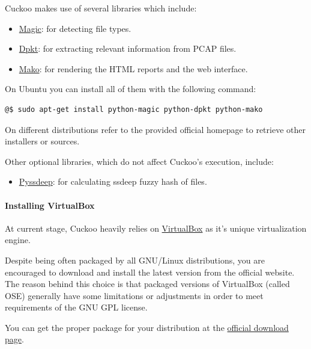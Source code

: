 \documentclass[letterpaper,10pt,english]{sphinxmanual}
\begin{document}
Cuckoo makes use of several libraries which include:
\begin{itemize}
\item {} 
\href{http://www.darwinsys.com/file/}{Magic}: for detecting file types.

\item {} 
\href{http://code.google.com/p/dpkt/}{Dpkt}: for extracting relevant information from PCAP files.

\item {} 
\href{http://www.makotemplates.org}{Mako}: for rendering the HTML reports and the web interface.

\end{itemize}

On Ubuntu you can install all of them with the following command:

\begin{Verbatim}[commandchars=@\[\]]
@$ sudo apt-get install python-magic python-dpkt python-mako
\end{Verbatim}

On different distributions refer to the provided official homepage to retrieve
other installers or sources.

Other optional libraries, which do not affect Cuckoo's execution, include:
\begin{itemize}
\item {} 
\href{http://code.google.com/p/pyssdeep/}{Pyssdeep}: for calculating ssdeep fuzzy hash of files.

\end{itemize}


\paragraph{Installing VirtualBox}
\label{installation/host/requirements:pyssdeep}\label{installation/host/requirements:installing-virtualbox}
At current stage, Cuckoo heavily relies on \href{http://www.virtualbox.org}{VirtualBox} as it's unique
virtualization engine.

Despite being often packaged by all GNU/Linux distributions, you are encouraged
to download and install the latest version from the official website. The reason
behind this choice is that packaged versions of VirtualBox (called OSE)
generally have some limitations or adjustments in order to meet requirements of
the GNU GPL license.

You can get the proper package for your distribution at the \href{https://www.virtualbox.org/wiki/Linux\_Downloads}{official download
page}.
\end{document}
